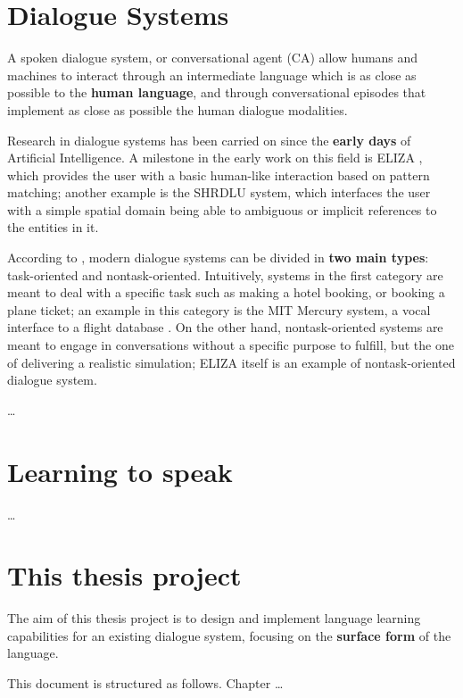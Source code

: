 
\section*{Dialogue Systems}

A spoken dialogue system, or conversational agent (CA) allow humans and machines to interact through an intermediate language which is as close as possible to the \textbf{human language}, and through conversational episodes that implement as close as possible the human dialogue modalities.

Research in dialogue systems has been carried on since the \textbf{early days} of Artificial Intelligence. A milestone in the early work on this field is ELIZA \cite{Weizenbaum:1966:ECP:365153.365168}, which provides the user with a basic human-like interaction based on pattern matching; another example is the SHRDLU system, which interfaces the user with a simple spatial domain being able to ambiguous or implicit references to the entities in it.

According to \cite{Jokinen2009}, modern dialogue systems can be divided in \textbf{two main types}: task-oriented and nontask-oriented. Intuitively, systems in the first category are meant to deal with a specific task such as making a hotel booking, or booking a plane ticket; an example in this category is the MIT Mercury system, a vocal interface to a flight database \cite{Seneff:2000:DMM:1605285.1605288}. On the other hand, nontask-oriented systems are meant to engage in conversations without a specific purpose to fulfill, but the one of delivering a realistic simulation; ELIZA itself is an example of nontask-oriented dialogue system.

\ldots


\section*{Learning to speak}

\ldots


\section*{This thesis project}

The aim of this thesis project is to design and implement language learning capabilities for an existing dialogue system, focusing on the \textbf{surface form} of the language.

This document is structured as follows. Chapter \ldots